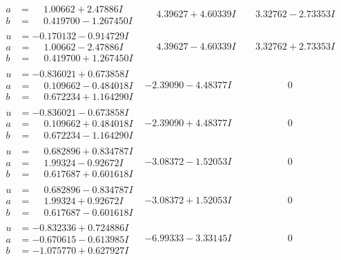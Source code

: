 \documentclass[1p]{elsarticle_modified}
\theoremstyle{definition}
\begin{document}
$$\begin{array}{c|c|c}
\begin{aligned}
a &= \phantom{-}1.00662 + 2.47886 I \\
b &= \phantom{-}0.419700 - 1.267450 I\end{aligned}
 & \phantom{-}4.39627 + 4.60339 I & \phantom{-}3.32762 - 2.73353 I \\ \hline\begin{aligned}
u &= -0.170132 - 0.914729 I \\
a &= \phantom{-}1.00662 - 2.47886 I \\
b &= \phantom{-}0.419700 + 1.267450 I\end{aligned}
 & \phantom{-}4.39627 - 4.60339 I & \phantom{-}3.32762 + 2.73353 I \\ \hline\begin{aligned}
u &= -0.836021 + 0.673858 I \\
a &= \phantom{-}0.109662 - 0.484018 I \\
b &= \phantom{-}0.672234 + 1.164290 I\end{aligned}
 & -2.39090 - 4.48377 I & \phantom{-0.000000 } 0 \\ \hline\begin{aligned}
u &= -0.836021 - 0.673858 I \\
a &= \phantom{-}0.109662 + 0.484018 I \\
b &= \phantom{-}0.672234 - 1.164290 I\end{aligned}
 & -2.39090 + 4.48377 I & \phantom{-0.000000 } 0 \\ \hline\begin{aligned}
u &= \phantom{-}0.682896 + 0.834787 I \\
a &= \phantom{-}1.99324 - 0.92672 I \\
b &= \phantom{-}0.617687 + 0.601618 I\end{aligned}
 & -3.08372 - 1.52053 I & \phantom{-0.000000 } 0 \\ \hline\begin{aligned}
u &= \phantom{-}0.682896 - 0.834787 I \\
a &= \phantom{-}1.99324 + 0.92672 I \\
b &= \phantom{-}0.617687 - 0.601618 I\end{aligned}
 & -3.08372 + 1.52053 I & \phantom{-0.000000 } 0 \\ \hline\begin{aligned}
u &= -0.832336 + 0.724886 I \\
a &= -0.670615 - 0.613985 I \\
b &= -1.075770 + 0.627927 I\end{aligned}
 & -6.99333 - 3.33145 I & \phantom{-0.000000 } 0 \\ \hline\begin{aligned}

\end{aligned}
\end{array}$$
\end{document}

